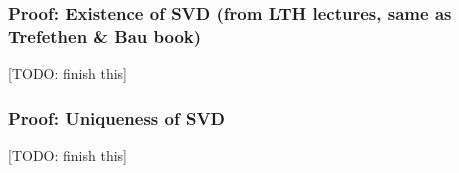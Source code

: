 \documentclass[
  12pt,
  paper=a4,
]{scrartcl} %
\begin{document}



\subsubsection*{Proof: Existence of SVD (from LTH lectures, same as Trefethen \& Bau book)}

[TODO: finish this]



\subsubsection*{Proof: Uniqueness of SVD}
[TODO: finish this]


\end{document}
